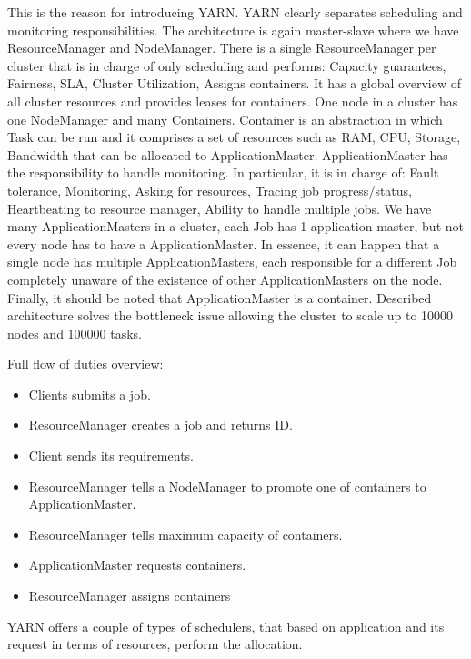 This is the reason for introducing YARN. YARN clearly separates scheduling and monitoring responsibilities. The architecture is again master-slave where we have ResourceManager and NodeManager. There is a single ResourceManager per cluster that is in charge of only scheduling and performs: Capacity guarantees, Fairness, SLA, Cluster Utilization, Assigns containers. It has a global overview of all cluster resources and provides leases for containers. One node in a cluster has one NodeManager and many Containers. Container is an abstraction in which Task can be run and it comprises a set of resources such as RAM, CPU, Storage, Bandwidth that can be allocated to ApplicationMaster. ApplicationMaster has the responsibility to handle monitoring. In particular, it is in charge of: Fault tolerance, Monitoring, Asking for resources, Tracing job progress/status, Heartbeating to resource manager, Ability to handle multiple jobs. We have many ApplicationMasters in a cluster, each Job has 1 application master, but not every node has to have a ApplicationMaster. In essence, it can happen that a single node has multiple ApplicationMasters, each responsible for a different Job completely unaware of the existence of other ApplicationMasters on the node. Finally, it should be noted that ApplicationMaster is a container. Described architecture solves the bottleneck issue allowing the cluster to scale up to 10000 nodes and 100000 tasks. 

Full flow of duties overview:
\begin{itemize}
	\item Clients submits a job. 
	\item ResourceManager creates a job and returns ID. \item Client sends its requirements. 
	\item ResourceManager tells a NodeManager to promote one of containers to ApplicationMaster. 
	\item ResourceManager tells maximum capacity of containers. 
	\item ApplicationMaster requests containers. 
	\item ResourceManager assigns containers 
\end{itemize}


YARN offers a couple of types of schedulers, that based on application and its request in terms of resources, perform the allocation.

